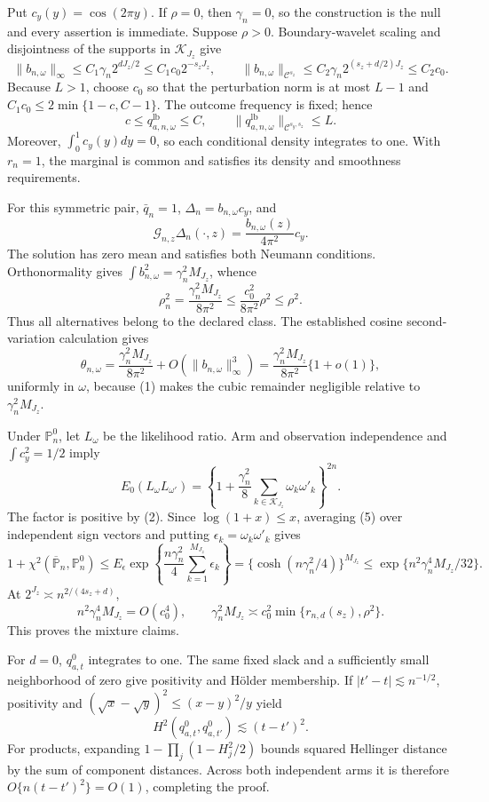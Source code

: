 Put \(c_y(y)=\cos(2\pi y)\).  If \(\rho=0\), then \(\gamma_n=0\), so the construction is the null and every assertion is immediate.  Suppose \(\rho>0\).  Boundary-wavelet scaling and disjointness of the supports in \(\mathcal K_{J_z}\) give
\[
\|b_{n,\omega}\|_\infty
\le C_1\gamma_n2^{dJ_z/2}\le C_1c_0 2^{-s_zJ_z},
\qquad
\|b_{n,\omega}\|_{\mathcal C^{s_z}}
\le C_2\gamma_n2^{(s_z+d/2)J_z}\le C_2c_0. \tag{1}
\]
Because \(L>1\), choose \(c_0\) so that the perturbation norm is at most \(L-1\) and \(C_1c_0\le2\min\{1-c,C-1\}\).  The outcome frequency is fixed; hence
\[
c\le q_{a,n,\omega}^{\mathrm{lb}}\le C,
\qquad \|q_{a,n,\omega}^{\mathrm{lb}}\|_{\mathcal C^{s_y,s_z}}\le L. \tag{2}
\]
Moreover, \(\int_0^1c_y(y)dy=0\), so each conditional density integrates to one.  With \(r_n=1\), the marginal is common and satisfies its density and smoothness requirements.

For this symmetric pair, \(\bar q_n=1\), \(\Delta_n=b_{n,\omega}c_y\), and
\[
\mathcal G_{n,z}\Delta_n(\cdot,z)
=\frac{b_{n,\omega}(z)}{4\pi^2}c_y.
\]
The solution has zero mean and satisfies both Neumann conditions.  Orthonormality gives \(\int b_{n,\omega}^2=\gamma_n^2M_{J_z}\), whence
\[
\rho_n^2=\frac{\gamma_n^2M_{J_z}}{8\pi^2}
\le\frac{c_0^2}{8\pi^2}\rho^2\le\rho^2. \tag{3}
\]
Thus all alternatives belong to the declared class.  The established cosine second-variation calculation gives
\[
\theta_{n,\omega}
=\frac{\gamma_n^2M_{J_z}}{8\pi^2}+O(\|b_{n,\omega}\|_\infty^3)
=\frac{\gamma_n^2M_{J_z}}{8\pi^2}\{1+o(1)\}, \tag{4}
\]
uniformly in \(\omega\), because (1) makes the cubic remainder negligible relative to \(\gamma_n^2M_{J_z}\).

Under \(\mathbb P_n^0\), let \(L_\omega\) be the likelihood ratio.  Arm and observation independence and \(\int c_y^2=1/2\) imply
\[
E_0(L_\omega L_{\omega'})
=\left\{1+\frac{\gamma_n^2}{8}\sum_{k\in\mathcal K_{J_z}}\omega_k\omega'_k\right\}^{2n}. \tag{5}
\]
The factor is positive by (2).  Since \(\log(1+x)\le x\), averaging (5) over independent sign vectors and putting \(\epsilon_k=\omega_k\omega'_k\) gives
\[
1+\chi^2(\overline{\mathbb P}_n,\mathbb P_n^0)
\le E_\epsilon\exp\!\left\{\frac{n\gamma_n^2}{4}\sum_{k=1}^{M_{J_z}}\epsilon_k\right\}
=\{\cosh(n\gamma_n^2/4)\}^{M_{J_z}}
\le\exp\{n^2\gamma_n^4M_{J_z}/32\}. \tag{6}
\]
At \(2^{J_z}\asymp n^{2/(4s_z+d)}\),
\[
n^2\gamma_n^4M_{J_z}=O(c_0^4),
\qquad
\gamma_n^2M_{J_z}\asymp c_0^2\min\{r_{n,d}(s_z),\rho^2\}. \tag{7}
\]
This proves the mixture claims.

For \(d=0\), \(q_{a,t}^0\) integrates to one.  The same fixed slack and a sufficiently small neighborhood of zero give positivity and H\"older membership.  If \(|t'-t|\lesssim n^{-1/2}\), positivity and \((\sqrt x-\sqrt y)^2\le(x-y)^2/y\) yield
\[
H^2(q_{a,t}^0,q_{a,t'}^0)\lesssim(t-t')^2.
\]
For products, expanding \(1-\prod_j(1-H_j^2/2)\) bounds squared Hellinger distance by the sum of component distances.  Across both independent arms it is therefore \(O\{n(t-t')^2\}=O(1)\), completing the proof.